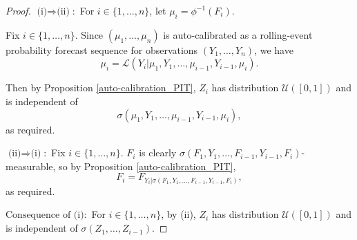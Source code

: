 \documentclass[10pt,a4paper]{amsart}
\begin{document}
\begin{proof}
  $\text{(i)} \Rightarrow \text{(ii)}$:\, For $i \in \{1, \ldots, n\}$, let $\mu_i = \phi^{-1}(F_i)$.

  Fix $i \in \{1, \ldots, n\}$. Since $(\mu_1, \ldots, \mu_n)$ is auto-calibrated as a rolling-event probability forecast sequence for observations $(Y_1, \ldots, Y_n)$, we have
\begin{equation*}
  \mu_i = \mathcal{L}(Y_i|\mu_1, Y_1, \ldots, \mu_{i-1}, Y_{i-1}, \mu_i).
\end{equation*}

  Then by Proposition \ref{auto-calibration_PIT}, $Z_i$ has distribution $\mathcal{U}([0,1])$ and is independent of
\begin{equation*}
  \sigma(\mu_1, Y_1, \ldots, \mu_{i-1}, Y_{i-1}, \mu_i),
\end{equation*}
  as required.

  $\text{(ii)} \Rightarrow \text{(i)}$:\, Fix $i \in \{1, \ldots, n\}$. $F_i$ is clearly $\sigma(F_1, Y_1, \ldots, F_{i-1}, Y_{i-1}, F_i)$-measurable, so by Proposition \ref{auto-calibration_PIT},
\begin{equation*}
  F_i = F_{Y_i|\sigma(F_1, Y_1, \ldots, F_{i-1}, Y_{i-1}, F_i)},
\end{equation*}
as required.

  $\text{Consequence of (i)}$:\, For $i \in \{1, \ldots, n\}$, by (ii), $Z_i$ has distribution $\mathcal{U}([0,1])$ and is independent of $\sigma(Z_1, \ldots, Z_{i-1})$.
\end{proof}
\end{document}
